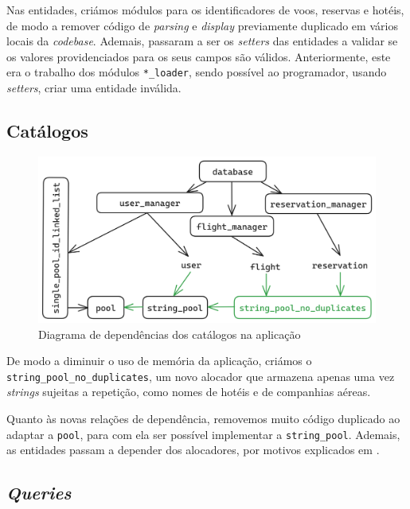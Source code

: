 \documentclass[11pt, a4paper]{article}
\begin{document}
Nas entidades, criámos módulos para os identificadores de voos, reservas e hotéis, de modo a remover
código de \emph{parsing} e \emph{display} previamente duplicado em vários locais da \emph{codebase}.
Ademais, passaram a ser os \emph{setters} das entidades a validar se os valores providenciados para
os seus campos são válidos. Anteriormente, este era o trabalho dos módulos \texttt{*\_loader}, sendo
possível ao programador, usando \emph{setters}, criar uma entidade inválida.

\subsection{Catálogos}
\label{sec:catalogs}

\begin{figure}[ht]
    \centering
    \includegraphics[scale=0.17]{res-fase2/database.png}
    \caption{Diagrama de dependências dos catálogos na aplicação}
    \label{fig:catalogs}
\end{figure}

De modo a diminuir o uso de memória da aplicação, criámos o \texttt{string\_pool\_no\_duplicates},
um novo alocador que armazena apenas uma vez \emph{strings} sujeitas a repetição, como nomes de
hotéis e de companhias aéreas.

Quanto às novas relações de dependência, removemos muito código duplicado ao adaptar a
\texttt{pool}, para com ela ser possível implementar a \texttt{string\_pool}. Ademais, as entidades
passam a depender dos alocadores, por motivos explicados em
.

\subsection{\emph{Queries}}
\label{sec:queries}
\end{document}
